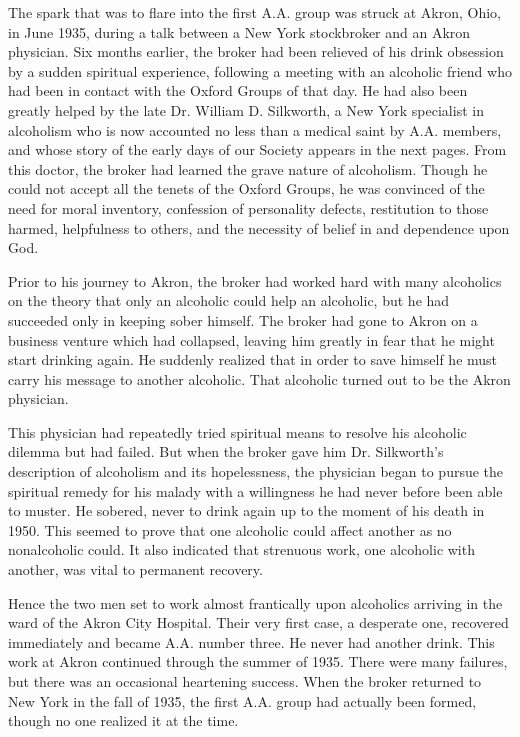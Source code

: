 The spark that was to ﬂare into the ﬁrst A.A. group was struck at Akron, Ohio, in June 1935, during a talk between a New York stockbroker and an Akron physician. 
Six months earlier, the broker had been relieved of his drink obsession by a sudden spiritual
experience, following a meeting with an alcoholic friend who had been in contact with the Oxford Groups of that day. 
He had also been greatly helped by the late Dr. William D. Silkworth, a New York specialist in alcoholism who is now accounted no less than a medical saint by A.A. members, and whose story of the early days of our Society appears in the next pages. 
From this doctor, the broker had learned the grave nature of alcoholism. 
Though he could not accept all the tenets of the Oxford Groups, he was convinced of the need for moral inventory, confession of personality defects, restitution to those harmed, helpfulness to others, and the necessity of belief in and dependence upon God.

Prior to his journey to Akron, the broker had worked hard with many alcoholics on the theory that only an alcoholic could help an alcoholic, but he had succeeded only in keeping sober himself. 
The broker had gone to Akron on a business venture which had collapsed, leaving him greatly in fear that he might start drinking again. 
He suddenly realized that in order to save himself he must carry his message to another alcoholic. 
That alcoholic turned out to be the Akron physician.

This physician had repeatedly tried spiritual means to resolve his alcoholic dilemma but had failed. 
But when the broker gave him Dr. Silkworth’s description of alcoholism and its hopelessness, the physician began to pursue the spiritual remedy for his malady with a willingness he had never before been able to muster.
He sobered, never to drink again up to the moment of his death in 1950. 
This seemed to prove that one alcoholic could affect another as no nonalcoholic
could.
It also indicated that strenuous work, one alcoholic with another, was vital to permanent recovery.

Hence the two men set to work almost frantically upon alcoholics arriving in the ward of the Akron City Hospital. 
Their very first case, a desperate one, recovered immediately and became A.A. number three. 
He never had another drink. 
This work at Akron continued through the summer of 1935. 
There were many failures, but there was an occasional heartening success. 
When the broker returned to New York in the fall of 1935, the ﬁrst A.A. group had actually been formed, though no one realized it at the time.

